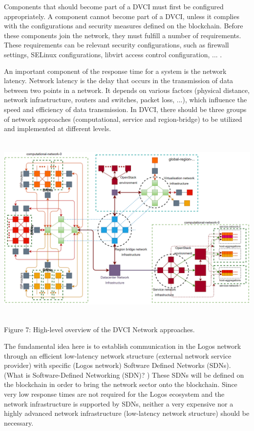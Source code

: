 \documentclass[]{article}
\begin{document}
Components that should become part of a DVCI must first be configured appropriately. 
A component cannot become part of a DVCI, unless it complies with the configurations and security measures defined on the blockchain. 
Before these components join the network, they must fulfill a number of requirements.
These requirements can be relevant security configurations, such as firewall settings, SELinux configurations, libvirt access control configuration, ... .

An important component of the response time for a system is the network latency.
Network latency is the delay that occurs in the transmission of data between two points in a network. 
It depends on various factors (physical distance, network infrastructure, routers and switches, packet loss, ...), which influence the speed and efficiency of data transmission.
In DVCI, there should be three groups of network approaches (computational, service and region-bridge) to be utilized and implemented at different levels.
 
\begin{center}
	\includegraphics[height=9.5cm]{dvci-network-overview}
\end{center}
\begin{center}
	Figure 7: High-level overview of the DVCI Network approaches.
\end{center}

The fundamental idea here is to establish communication in the Logos network through an efficient low-latency network structure (external network service provider) with specific (Logos network) Software Defined Networks (SDNs). (What is Software-Defined Networking (SDN)? \cite{VMwareDoc-sdn})
These SDNs will be defined on the blockchain in order to bring the network sector onto the blockchain.
Since very low response times are not required for the Logos ecosystem and the network infrastructure is supported by SDNs, neither a very expensive nor a highly advanced network infrastructure (low-latency network structure) should be necessary.
\newline
\end{document}
